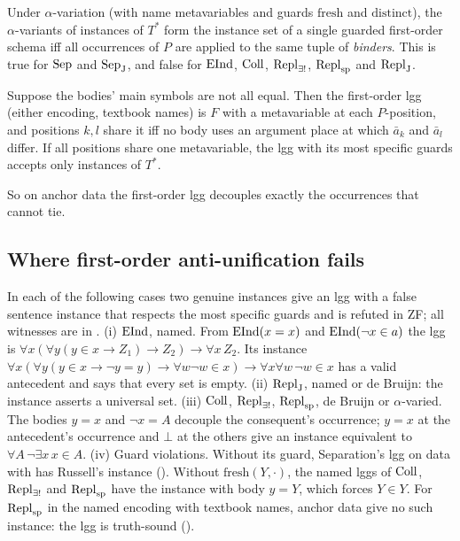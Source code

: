 \begin{proposition}\label{prop:zf:alpha}
Under $\alpha$-variation (with name metavariables and guards $\mathrm{fresh}$ and $\mathrm{distinct}$), the
$\alpha$-variants of instances of $T^*$ form the instance set of a single guarded first-order schema iff all
occurrences of $P$ are applied to the same tuple of \emph{binders}. This is true for $\mathrm{Sep}$ and $\mathrm{Sep}_{\mathrm J}$,
and false for $\mathrm{EInd}$, $\mathrm{Coll}$, $\mathrm{Repl}_{\exists!}$, $\mathrm{Repl}_{\mathrm{sp}}$ and $\mathrm{Repl}_{\mathrm{J}}$.
\end{proposition}

\begin{proposition}\label{prop:zf:folgg}
Suppose the bodies' main symbols are not all equal. Then the first-order lgg (either encoding, textbook names) is $F$
with a metavariable at each $P$-position, and positions $k,l$ share it iff no body uses an argument place at which
$\bar a_k$ and $\bar a_l$ differ. If all positions share one metavariable, the lgg with its most specific guards accepts
only instances of $T^*$.
\end{proposition}
So on anchor data the first-order lgg decouples exactly the occurrences that  cannot tie.

\subsection{Where first-order anti-unification fails}\label{sec:zf:fofail}

\begin{proposition}\label{prop:zf:false}
In each of the following cases two genuine instances give an lgg with a false sentence instance that respects the
most specific guards and is refuted in ZF; all witnesses are in .
(i) $\mathrm{EInd}$, named. From $\mathrm{EInd}(x=x)$ and $\mathrm{EInd}(\neg x\in a)$ the lgg is $\forall x(\forall y(y\in x\to Z_1)\to
Z_2)\to\forall x\,Z_2$. Its instance $\forall x(\forall y(y\in x\to\neg y=y)\to\forall w\neg w\in x)\to\forall x\forall
w\,\neg w\in x$ has a valid antecedent and says that every set is empty.
(ii) $\mathrm{Repl}_{\mathrm{J}}$, named or de Bruijn: the instance asserts a universal set.
(iii) $\mathrm{Coll}$, $\mathrm{Repl}_{\exists!}$, $\mathrm{Repl}_{\mathrm{sp}}$, de Bruijn or $\alpha$-varied. The bodies $y=x$ and $\neg x=A$ decouple the
consequent's occurrence; $y=x$ at the antecedent's occurrence and $\bot$ at the others give an instance equivalent to
$\forall A\,\neg\exists x\,x\in A$.
(iv) Guard violations. Without its guard, Separation's lgg on data with \evR{} has Russell's instance
(). Without $\mathrm{fresh}(Y,\cdot)$, the named lggs of $\mathrm{Coll}$, $\mathrm{Repl}_{\exists!}$ and $\mathrm{Repl}_{\mathrm{sp}}$ have the
instance with body $y=Y$, which forces $Y\in Y$.
For $\mathrm{Repl}_{\mathrm{sp}}$ in the named encoding with textbook names, anchor data give no such instance: the lgg is truth-sound
().
\end{proposition}

